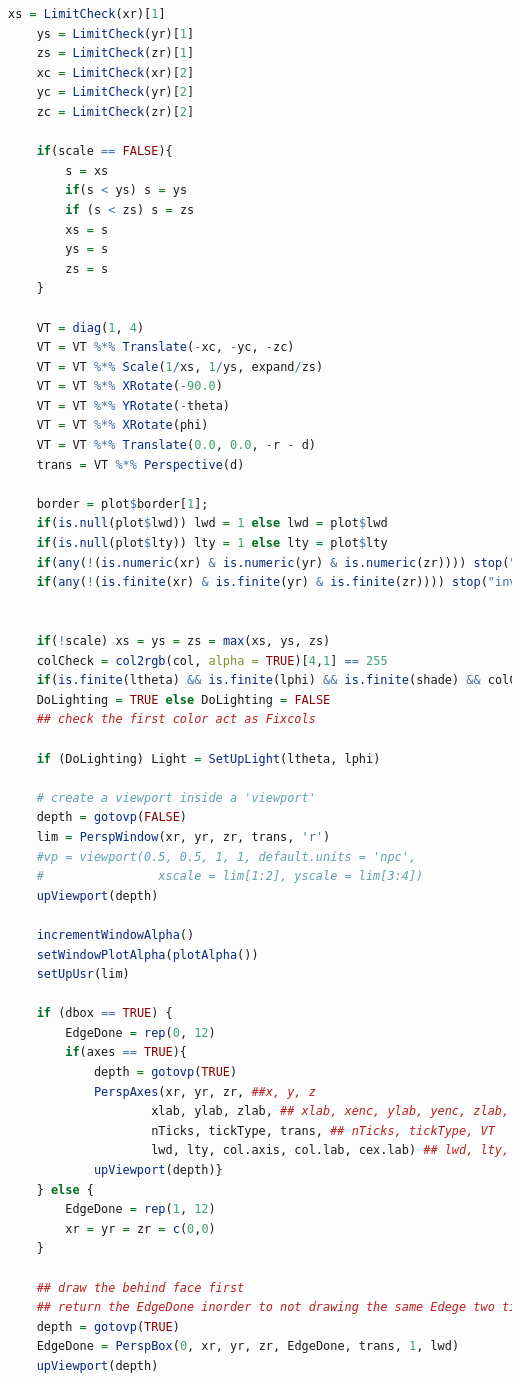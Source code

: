 \documentclass{report}
\begin{document}
\begin{lstlisting}[language = R]
	xs = LimitCheck(xr)[1]
    ys = LimitCheck(yr)[1]
    zs = LimitCheck(zr)[1]
    xc = LimitCheck(xr)[2]
    yc = LimitCheck(yr)[2]
    zc = LimitCheck(zr)[2]
	
	if(scale == FALSE){
		s = xs
		if(s < ys) s = ys
		if (s < zs) s = zs
		xs = s
		ys = s
		zs = s
	}
    
    VT = diag(1, 4)
    VT = VT %*% Translate(-xc, -yc, -zc)
    VT = VT %*% Scale(1/xs, 1/ys, expand/zs)
    VT = VT %*% XRotate(-90.0)
    VT = VT %*% YRotate(-theta)
    VT = VT %*% XRotate(phi)
    VT = VT %*% Translate(0.0, 0.0, -r - d)
    trans = VT %*% Perspective(d)

    border = plot$border[1];
    if(is.null(plot$lwd)) lwd = 1 else lwd = plot$lwd
    if(is.null(plot$lty)) lty = 1 else lty = plot$lty
    if(any(!(is.numeric(xr) & is.numeric(yr) & is.numeric(zr)))) stop("invalid limits")
    if(any(!(is.finite(xr) & is.finite(yr) & is.finite(zr)))) stop("invalid limits")
    
    
    if(!scale) xs = ys = zs = max(xs, ys, zs)
    colCheck = col2rgb(col, alpha = TRUE)[4,1] == 255
    if(is.finite(ltheta) && is.finite(lphi) && is.finite(shade) && colCheck)
    DoLighting = TRUE else DoLighting = FALSE
    ## check the first color act as Fixcols
    
    if (DoLighting) Light = SetUpLight(ltheta, lphi)
    
    # create a viewport inside a 'viewport'
    depth = gotovp(FALSE)
    lim = PerspWindow(xr, yr, zr, trans, 'r')
    #vp = viewport(0.5, 0.5, 1, 1, default.units = 'npc',
    #                xscale = lim[1:2], yscale = lim[3:4])
    upViewport(depth)
    
    incrementWindowAlpha()
    setWindowPlotAlpha(plotAlpha())
    setUpUsr(lim)
    
    if (dbox == TRUE) {
        EdgeDone = rep(0, 12)
        if(axes == TRUE){
            depth = gotovp(TRUE)
            PerspAxes(xr, yr, zr, ##x, y, z
                    xlab, ylab, zlab, ## xlab, xenc, ylab, yenc, zlab, zenc
                    nTicks, tickType, trans, ## nTicks, tickType, VT
                    lwd, lty, col.axis, col.lab, cex.lab) ## lwd, lty, col.axis, col.lab, cex.lab
            upViewport(depth)}
    } else {
        EdgeDone = rep(1, 12)
        xr = yr = zr = c(0,0)
    }
    
    ## draw the behind face first
    ## return the EdgeDone inorder to not drawing the same Edege two times.
    depth = gotovp(TRUE)
    EdgeDone = PerspBox(0, xr, yr, zr, EdgeDone, trans, 1, lwd)
    upViewport(depth)
    

\end{lstlisting}
\end{document}
